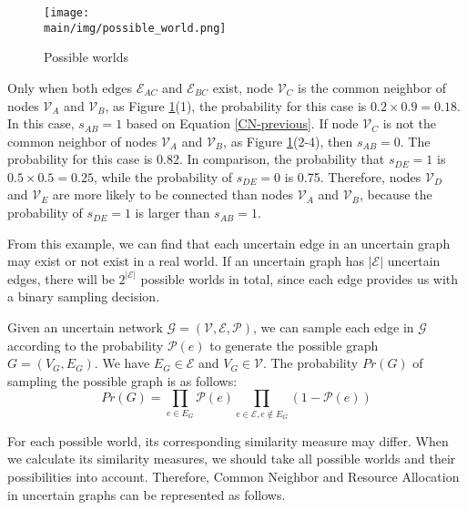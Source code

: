 \documentclass[\main/thesis.tex]{subfiles}
\begin{document}
\begin{figure}
\texttt{[image: \\main/img/possible\_world.png]}
\centering
\caption{Possible worlds}
\label{possible-world-link}
\end{figure}

Only when both edges $\mathcal{E}_{AC}$ and $\mathcal{E}_{BC}$ exist, node $\mathcal{V}_C$ is the common neighbor of nodes $\mathcal{V}_A$ and $\mathcal{V}_B$, as Figure \ref{possible-world-link}(1), the probability for this case is $0.2\times 0.9=0.18$. In this case, $s_{AB}=1$ based on Equation \ref{CN-previous}. If node $\mathcal{V}_C$ is not the common neighbor of nodes $\mathcal{V}_A$ and $\mathcal{V}_B$, as Figure \ref{possible-world-link}(2-4),  then $s_{AB}=0$. The probability for this case is 0.82. In comparison, the probability that $s_{DE}=1$ is $0.5\times 0.5=0.25$, while the probability of $s_{DE}=0$ is 0.75. Therefore, nodes $\mathcal{V}_D$ and $\mathcal{V}_E$ are more likely to be connected than nodes $\mathcal{V}_A$ and $\mathcal{V}_B$, because the probability of $s_{DE}=1$ is larger than $s_{AB}=1$. 

From this example, we can find that each uncertain edge in an uncertain graph may exist or not exist in a real world. If an uncertain graph has $|\mathcal{E}|$ uncertain edges, there will be $2^{|\mathcal{E}|}$ possible worlds in total, since each edge provides us with a binary sampling decision.

Given an uncertain network $\mathcal{G = (V,E,P)}$, we can sample each edge in $\mathcal{G}$ according to the probability $\mathcal{P}(e)$ to generate the possible graph $G = (V_G,E_G)$. We have $E_G \in \mathcal{E}$ and $V_G \in \mathcal{V}$. The probability $Pr(G)$ of sampling the possible graph is as follows:
\begin{equation}
Pr(G) = \prod_{e\in E_G}\mathcal{P}(e)\prod_{e\in \mathcal{E}, e\notin E_G}(1-\mathcal{P}(e))
\label{probability-of-possible-world}
\end{equation}

For each possible world, its corresponding similarity measure may differ. When we calculate its similarity measures, we should take all possible worlds and their possibilities into account. Therefore, Common Neighbor and Resource Allocation in uncertain graphs can be represented as follows.
\end{document}
